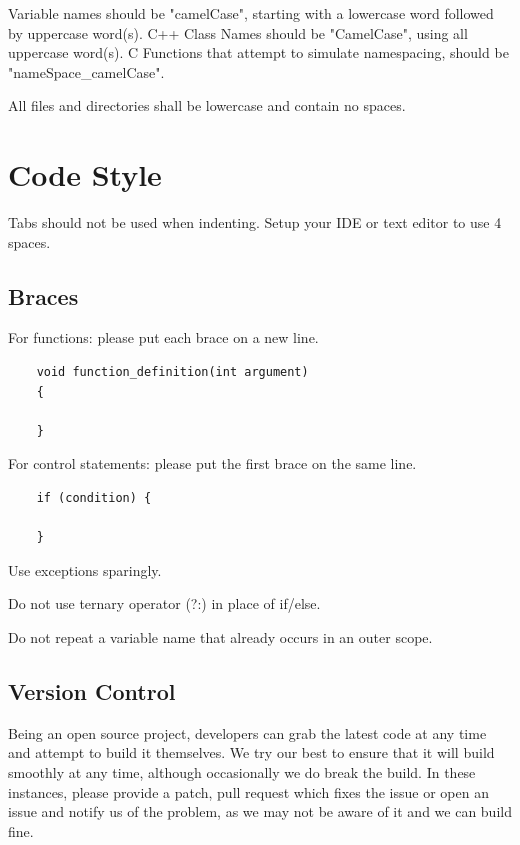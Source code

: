 \documentclass[a4paper, 11pt]{report}
\begin{document}
Variable names should be "camelCase", starting with a lowercase word followed by uppercase word(s).
C++ Class Names should be "CamelCase", using all uppercase word(s).
C Functions that attempt to simulate namespacing, should be "nameSpace\_camelCase".

All files and directories shall be lowercase and contain no spaces.

\section{Code Style}

Tabs should not be used when indenting. Setup your IDE or text editor to use 4 spaces.

\subsection{Braces}

For functions: please put each brace on a new line.

\begin{verbatim}
    void function_definition(int argument)
    {
    
    }
  \end{verbatim}

For control statements: please put the first brace on the same line.

\begin{verbatim}
    if (condition) {
    
    }
\end{verbatim}

Use exceptions sparingly.

Do not use ternary operator (?:) in place of if/else.

Do not repeat a variable name that already occurs in an outer scope.

\subsection{Version Control}

Being an open source project, developers can grab the latest code at any time
and attempt to build it themselves. We try our best to ensure that it will build smoothly
at any time, although occasionally we do break the build. In these instances,
please provide a patch, pull request which fixes the issue or open an issue and
notify us of the problem, as we may not be aware of it and we can build fine.
\end{document}
